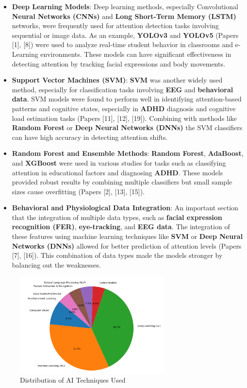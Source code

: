 \documentclass[12pt]{article}
\begin{document}
\begin{itemize}
    \item \textbf{Deep Learning Models}: Deep learning methods, especially Convolutional \textbf{Neural Networks (CNNs)} and \textbf{Long Short-Term Memory (LSTM)} networks, were frequently used for attention detection tasks involving sequential or image data. As an example, \textbf{YOLOv3} and \textbf{YOLOv5} (Papers [1], [8]) were used to analyze real-time student behavior in classrooms and e-Learning environments. These models can have significant effectiveness in detecting attention by tracking facial expressions and body movements.
    \item \textbf{Support Vector Machines (SVM)}: \textbf{SVM} was another widely used method, especially for classification tasks involving \textbf{EEG} and \textbf{behavioral data}. SVM models were found to perform well in identifying attention-based patterns and cognitive states, especially in \textbf{ADHD} diagnosis and cognitive load estimation tasks (Papers [11], [12], [19]). Combining with methods like \textbf{Random Forest} or \textbf{Deep Neural Networks (DNNs)} the SVM classifiers can have high accuracy in detecting attention shifts.
    \item \textbf{Random Forest and Ensemble Methods}: \textbf{Random Forest}, \textbf{AdaBoost}, and \textbf{XGBoost} were used in various studies for tasks such as classifying attention in educational factors and diagnosing \textbf{ADHD}. These models provided robust results by combining multiple classifiers but small sample sizes cause overfitting (Papers [2], [13], [15]).
    \item \textbf{Behavioral and Physiological Data Integration}: An important section that the integration of multiple data types, such as \textbf{facial expression recognition (FER)}, \textbf{eye-tracking}, and \textbf{EEG data}. The integration of these features using machine learning techniques like \textbf{SVM} or \textbf{Deep Neural Networks (DNNs)} allowed for better prediction of attention levels (Papers [7], [16]). This combination of data types made the models stronger by balancing out the weaknesses.
\end{itemize}

\begin{figure}[H]
\centering
\includegraphics[width=0.7\textwidth]{piechart.png}
\caption{Distribution of AI Techniques Used}
\end{figure}
\end{document}
